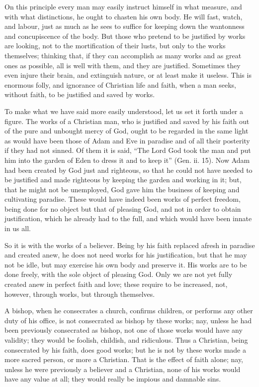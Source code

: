 On this principle every man may easily instruct himself in what measure,
and with what distinctions, he ought to chasten his own body. He will
fast, watch, and labour, just as much as he sees to suffice for keeping
down the wantonness and concupiscence of the body. But those who pretend
to be justified by works are looking, not to the mortification of their
lusts, but only to the works themselves; thinking that, if they can
accomplish as many works and as great ones as possible, all is well with
them, and they are justified. Sometimes they even injure their brain, and
extinguish nature, or at least make it useless. This is enormous folly,
and ignorance of Christian life and faith, when a man seeks, without
faith, to be justified and saved by works.

To make what we have said more easily understood, let us set it forth
under a figure. The works of a Christian man, who is justified and saved
by his faith out of the pure and unbought mercy of God, ought to be
regarded in the same light as would have been those of Adam and Eve in
paradise and of all their posterity if they had not sinned. Of them it is
said, ``The Lord God took the man and put him into the garden of Eden to
dress it and to keep it'' (Gen. ii. 15). Now Adam had been created by God
just and righteous, so that he could not have needed to be justified and
made righteous by keeping the garden and working in it; but, that he might
not be unemployed, God gave him the business of keeping and cultivating
paradise. These would have indeed been works of perfect freedom, being
done for no object but that of pleasing God, and not in order to obtain
justification, which he already had to the full, and which would have been
innate in us all.

So it is with the works of a believer. Being by his faith replaced afresh
in paradise and created anew, he does not need works for his
justification, but that he may not be idle, but may exercise his own body
and preserve it. His works are to be done freely, with the sole object of
pleasing God. Only we are not yet fully created anew in perfect faith and
love; these require to be increased, not, however, through works, but
through themselves.

A bishop, when he consecrates a church, confirms children, or performs any
other duty of his office, is not consecrated as bishop by these works;
nay, unless he had been previously consecrated as bishop, not one of those
works would have any validity; they would be foolish, childish, and
ridiculous. Thus a Christian, being consecrated by his faith, does good
works; but he is not by these works made a more sacred person, or more a
Christian. That is the effect of faith alone; nay, unless he were
previously a believer and a Christian, none of his works would have any
value at all; they would really be impious and damnable sins.

